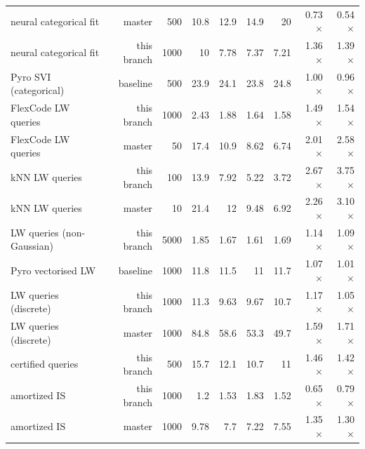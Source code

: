 \begin{table}[H]
{\begin{tabular}{lrrrrrrrr}
neural categorical fit & master & 500 & 10.8 & 12.9 & 14.9 & 20 & 0.73$\times$ & 0.54$\times$ \\
neural categorical fit & this branch & 1000 & 10 & 7.78 & 7.37 & 7.21 & 1.36$\times$ & 1.39$\times$ \\
Pyro SVI (categorical) & baseline & 500 & 23.9 & 24.1 & 23.8 & 24.8 & 1.00$\times$ & 0.96$\times$ \\
FlexCode LW queries & this branch & 1000 & 2.43 & 1.88 & 1.64 & 1.58 & 1.49$\times$ & 1.54$\times$ \\
FlexCode LW queries & master & 50 & 17.4 & 10.9 & 8.62 & 6.74 & 2.01$\times$ & 2.58$\times$ \\
kNN LW queries & this branch & 100 & 13.9 & 7.92 & 5.22 & 3.72 & 2.67$\times$ & 3.75$\times$ \\
kNN LW queries & master & 10 & 21.4 & 12 & 9.48 & 6.92 & 2.26$\times$ & 3.10$\times$ \\
LW queries (non-Gaussian) & this branch & 5000 & 1.85 & 1.67 & 1.61 & 1.69 & 1.14$\times$ & 1.09$\times$ \\
Pyro vectorised LW & baseline & 1000 & 11.8 & 11.5 & 11 & 11.7 & 1.07$\times$ & 1.01$\times$ \\
LW queries (discrete) & this branch & 1000 & 11.3 & 9.63 & 9.67 & 10.7 & 1.17$\times$ & 1.05$\times$ \\
LW queries (discrete) & master & 1000 & 84.8 & 58.6 & 53.3 & 49.7 & 1.59$\times$ & 1.71$\times$ \\
certified queries & this branch & 500 & 15.7 & 12.1 & 10.7 & 11 & 1.46$\times$ & 1.42$\times$ \\
amortized IS & this branch & 1000 & 1.2 & 1.53 & 1.83 & 1.52 & 0.65$\times$ & 0.79$\times$ \\
amortized IS & master & 1000 & 9.78 & 7.7 & 7.22 & 7.55 & 1.35$\times$ & 1.30$\times$ \\
\bottomrule\end{tabular}}
\end{table}
